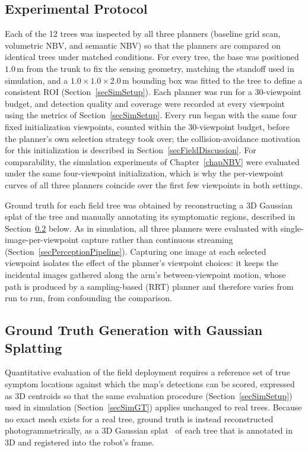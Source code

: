 \subsection{Experimental Protocol} \label{secFieldProtocol}

Each of the 12 trees was inspected by all three planners (baseline grid
scan, volumetric NBV, and semantic NBV) so that the planners are compared
on identical trees under matched conditions. For every tree, the base was
positioned $1.0$\,m from the trunk to fix the sensing geometry, matching the
standoff used in simulation, and a $1.0 \times 1.0 \times 2.0$\,m bounding
box was fitted to the tree to define a consistent ROI
(Section~\ref{secSimSetup}). Each planner was run for a 30-viewpoint budget,
and detection quality and coverage were recorded at every viewpoint using
the metrics of Section~\ref{secSimSetup}.
Every run began with the same four fixed initialization viewpoints,
counted within the 30-viewpoint budget, before the planner's own selection
strategy took over; the collision-avoidance motivation for this
initialization is described in Section~\ref{secFieldDiscussion}.
For comparability, the simulation experiments of Chapter~\ref{chapNBV}
were evaluated under the same four-viewpoint initialization, which is why
the per-viewpoint curves of all three planners coincide over the first few
viewpoints in both settings.

Ground truth for each field tree was obtained by reconstructing a 3D
Gaussian splat of the tree and manually annotating its symptomatic regions,
described in Section~\ref{secGSSplat} below. As in simulation, all three
planners were evaluated with single-image-per-viewpoint capture rather than
continuous streaming (Section~\ref{secPerceptionPipeline}). Capturing one
image at each selected viewpoint isolates the effect of the planner's
viewpoint choices: it keeps the incidental images gathered along the arm's
between-viewpoint motion, whose path is produced by a sampling-based (RRT)
planner and therefore varies from run to run, from confounding the
comparison.

\subsection{Ground Truth Generation with Gaussian Splatting} \label{secGSSplat}

Quantitative evaluation of the field deployment requires a reference set of
true symptom locations against which the map's detections can be scored,
expressed as 3D centroids so that the same evaluation procedure
(Section~\ref{secSimSetup}) used in simulation (Section~\ref{secSimGT})
applies unchanged to real trees. Because no exact mesh exists for a real
tree, ground truth is instead reconstructed photogrammetrically, as a 3D
Gaussian splat~\cite{kerbl20233dgs} of each tree that is annotated in 3D
and registered into the robot's frame.

